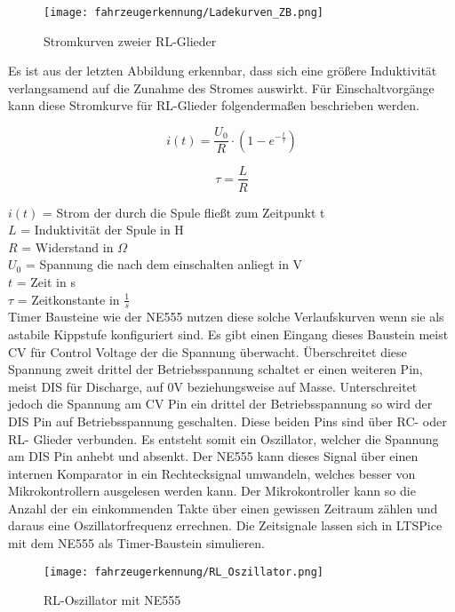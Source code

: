 \begin{figure}[H]
    \centering
    \texttt{[image: fahrzeugerkennung/Ladekurven\_ZB.png]}
    \caption{Stromkurven zweier RL-Glieder}
\end{figure}

Es ist aus der letzten Abbildung erkennbar, dass sich eine größere Induktivität verlangsamend auf die Zunahme des Stromes auswirkt. Für Einschaltvorgänge kann diese Stromkurve
für RL-Glieder folgendermaßen beschrieben werden.

\begin{equation} \label{eq:i_L}
    i(t) = \frac{U_{0}}{R} \cdot (1 - e^{-\frac{t}{\tau}})
\end{equation}

\begin{equation} \label{eq:tau_RL}
    \tau = \frac{L}{R}
\end{equation} 


$i(t)$ = Strom der durch die Spule fließt zum Zeitpunkt t \\
$L$ = Induktivität der Spule in H\\
$R$ = Widerstand in $\Omega$ \\
$U_0$ = Spannung die nach dem einschalten anliegt in V\\
$t$ = Zeit in s \\
$\tau$ = Zeitkonstante in $\frac{1}{s}$\\

Timer Bausteine wie der NE555 nutzen diese solche Verlaufskurven wenn sie als astabile Kippstufe konfiguriert sind.
Es gibt einen Eingang dieses Baustein meist CV für Control Voltage der die Spannung überwacht. Überschreitet diese Spannung zweit drittel
der Betriebsspannung schaltet er einen weiteren Pin, meist DIS für Discharge, auf 0V beziehungsweise auf Masse. Unterschreitet jedoch 
die Spannung am CV Pin ein drittel der Betriebsspannung so wird der DIS Pin auf Betriebsspannung geschalten. Diese beiden Pins 
sind über RC- oder RL- Glieder verbunden. Es entsteht somit ein Oszillator, welcher die Spannung am DIS Pin anhebt und absenkt.
Der NE555 kann dieses Signal über einen internen Komparator in ein Rechtecksignal umwandeln, welches besser von Mikrokontrollern ausgelesen
werden kann. Der Mikrokontroller kann so die Anzahl der ein einkommenden Takte über einen gewissen Zeitraum zählen und daraus eine Oszillatorfrequenz errechnen.
Die Zeitsignale lassen sich in LTSPice mit dem NE555 als Timer-Baustein simulieren.

\begin{figure}[H]
    \centering
    \texttt{[image: fahrzeugerkennung/RL\_Oszillator.png]}
    \caption{RL-Oszillator mit NE555}
\end{figure}

